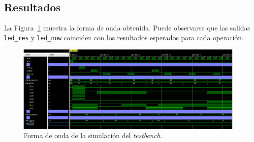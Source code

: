 \subsection{Resultados}
La Figura~\ref{fig:simulacion_tb} muestra la forma de onda obtenida. Puede observarse que las salidas \texttt{led\_res} y \texttt{led\_now} coinciden con los resultados esperados para cada operación.

\begin{figure}[H]
    \centering
    \includegraphics[width=\textwidth]{img/simulacion.png}
    \caption{Forma de onda de la simulación del \textit{testbench}.}
    \label{fig:simulacion_tb}
\end{figure}